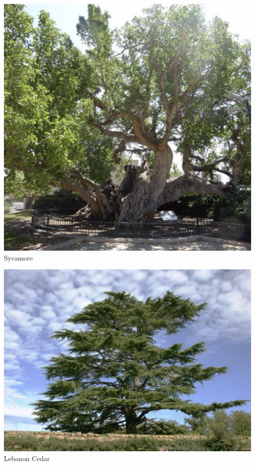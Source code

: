 \documentclass[11pt]{article}
\begin{document}
\vspace{1em}
\begin{center}
\begin{minipage}[t]{0.45\textwidth}
\centering
\includegraphics[width=\textwidth]{sycamore.png}\\
\vspace{0.5em}
Sycamore
\end{minipage}
\hspace{0.05\textwidth}
\begin{minipage}[t]{0.45\textwidth}
\centering
\includegraphics[width=\textwidth]{lebanon-cedar.png}\\
\vspace{0.5em}
Lebanon Cedar
\end{minipage}
\end{center}
\vspace{1em}
\end{document}
